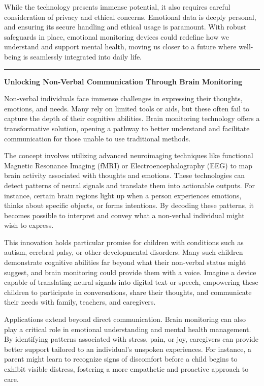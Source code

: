 \documentclass[12pt, research paper]{report}
\begin{document}
	\noindent While the technology presents immense potential, it also requires careful consideration of privacy and ethical concerns. Emotional data is deeply personal, and ensuring its secure handling and ethical usage is paramount. With robust safeguards in place, emotional monitoring devices could redefine how we understand and support mental health, moving us closer to a future where well-being is seamlessly integrated into daily life.
	
	\noindent \rule{13.85cm}{0.01cm}
	\noindent \textbf{Unlocking Non-Verbal Communication Through Brain Monitoring}
	
	\noindent Non-verbal individuals face immense challenges in expressing their thoughts, emotions, and needs. Many rely on limited tools or aids, but these often fail to capture the depth of their cognitive abilities. Brain monitoring technology offers a transformative solution, opening a pathway to better understand and facilitate communication for those unable to use traditional methods.
	\bigskip
	
	\noindent The concept involves utilizing advanced neuroimaging techniques like functional Magnetic Resonance Imaging (fMRI) or Electroencephalography (EEG) to map brain activity associated with thoughts and emotions. These technologies can detect patterns of neural signals and translate them into actionable outputs. For instance, certain brain regions light up when a person experiences emotions, thinks about specific objects, or forms intentions. By decoding these patterns, it becomes possible to interpret and convey what a non-verbal individual might wish to express.
	\bigskip 
	
	\noindent This innovation holds particular promise for children with conditions such as autism, cerebral palsy, or other developmental disorders. Many such children demonstrate cognitive abilities far beyond what their non-verbal status might suggest, and brain monitoring could provide them with a voice. Imagine a device capable of translating neural signals into digital text or speech, empowering these children to participate in conversations, share their thoughts, and communicate their needs with family, teachers, and caregivers.
	\bigskip
	
	\noindent Applications extend beyond direct communication. Brain monitoring can also play a critical role in emotional understanding and mental health management. By identifying patterns associated with stress, pain, or joy, caregivers can provide better support tailored to an individual's unspoken experiences. For instance, a parent might learn to recognize signs of discomfort before a child begins to exhibit visible distress, fostering a more empathetic and proactive approach to care.
	\bigskip 
	
\end{document}
